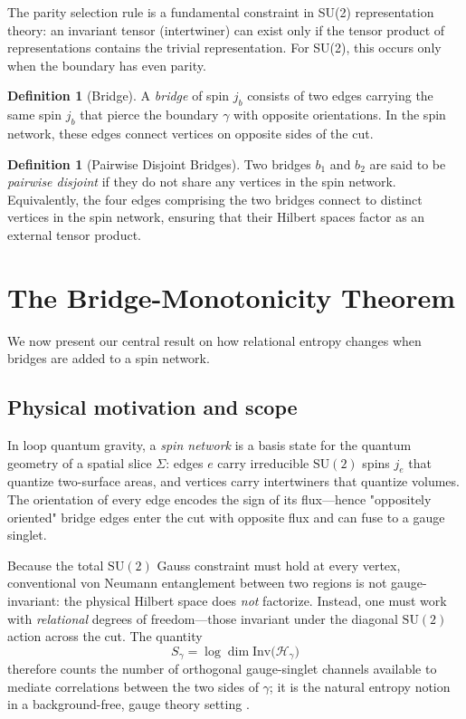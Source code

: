 \documentclass[11pt, a4paper]{article}
\theoremstyle{plain}
\theoremstyle{definition}
\newtheorem{definition}[theorem]{Definition}
\theoremstyle{remark}
\newcommand{\Hil}{\mathcal{H}}
\newcommand{\Inv}{\mathrm{Inv}}
\newcommand{\SU}{\mathrm{SU}}
\begin{document}
The parity selection rule is a fundamental constraint in SU(2) representation theory: an invariant tensor (intertwiner) can exist only if the tensor product of representations contains the trivial representation. For SU(2), this occurs only when the boundary has even parity.

\begin{definition}[Bridge]
  \label{def:bridge}
  A \emph{bridge} of spin $j_b$ consists of two edges carrying the same spin $j_b$ that pierce the boundary $\gamma$ with opposite orientations. In the spin network, these edges connect vertices on opposite sides of the cut.
\end{definition}

\begin{definition}[Pairwise Disjoint Bridges]
  \label{def:disjoint_bridges}
  Two bridges $b_1$ and $b_2$ are said to be \emph{pairwise disjoint} if they do not share any vertices in the spin network. Equivalently, the four edges comprising the two bridges connect to distinct vertices in the spin network, ensuring that their Hilbert spaces factor as an external tensor product.
\end{definition}

\section{The Bridge-Monotonicity Theorem}
\label{sec:bridge-monotonicity}

We now present our central result on how relational entropy changes when bridges are added to a spin network.

\subsection{Physical motivation and scope}
\label{sec:motivation}

In loop quantum gravity, a \emph{spin network} is a basis state for the quantum geometry of a spatial slice $\Sigma$: edges $e$ carry irreducible $\SU(2)$ spins $j_e$ that quantize two-surface areas, and vertices carry intertwiners that quantize volumes. The orientation of every edge encodes the sign of its flux—hence "oppositely oriented" bridge edges enter the cut with opposite flux and can fuse to a gauge singlet.

Because the total $\SU(2)$ Gauss constraint must hold at every vertex, conventional von Neumann entanglement between two regions is not gauge-invariant: the physical Hilbert space does \emph{not} factorize. Instead, one must work with \emph{relational} degrees of freedom—those invariant under the diagonal $\SU(2)$ action across the cut. The quantity
\[  S_{\gamma}=\log\dim\Inv\bigl(\Hil_{\gamma}\bigr)\]
therefore counts the number of orthogonal gauge-singlet channels available to mediate correlations between the two sides of $\gamma$; it is the natural entropy notion in a background-free, gauge theory setting \cite{DonnellyFreidel2016,DonnellyWall2016}.
\end{document}
